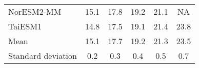 \begin{table}
\begin{tabular}{lccccc}
    NorESM2-MM         & 15.1                         & 17.8                         & 19.2                         & 21.1                         & NA                           \\
    TaiESM1            & 14.8                         & 17.5                         & 19.1                         & 21.4                         & 23.8                         \\
    \hline
    Mean               & 15.1                         & 17.7                         & 19.2                         & 21.3                         & 23.5                         \\
    Standard deviation & 0.2                          & 0.3                          & 0.4                          & 0.5                          & 0.7                          \\
  \end{tabular}
\end{table}

